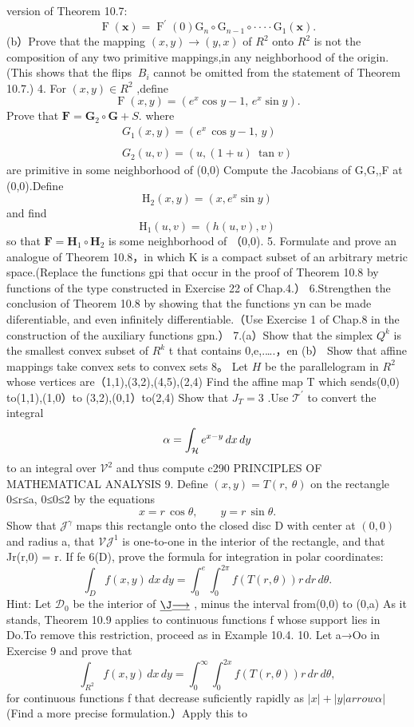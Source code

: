 version of Theorem 10.7: $$ \operatorname{F}(\mathbf{x})=\operatorname{F}^{\prime}(0)\mathrm{G}_{n}\circ\mathrm{G}_{n-1}\circ\cdot\cdot\cdot\cdot\mathrm{G}_{1}(\mathbf{x}). $$ (b）Prove that the mapping $(x,y)\to(y,x)$ of $R^{2}$ onto $R^{2}$ is not the composition of any two primitive mappings,in any neighborhood of the origin.(This shows that the flips $\ B_{i}$ cannot be omitted from the statement of Theorem 10.7.) 4. For $(x,y)\in R^{2}$ ,define $$ \operatorname{F}(x,y)=(e^{x}\cos y-1,\,e^{x}\sin y). $$ Prove that $\scriptstyle\mathbf{F}=\mathbf{G}_{2}\circ\mathbf{G}+S.$ where $$ \begin{array}{c}{{G_{1}(x,y)=(e^{x}\,\cos y-1,\,y)}}\\ {{{}}}\\ {{G_{2}(u,v)=(u,(1+u)\:\tan v)}}\end{array} $$ are primitive in some neighborhood of (0,0) Compute the Jacobians of G,G,,F at (0,0).Define $$ \mathrm{H}_{2}(x,y)=(x,e^{x}\sin y) $$ and find $$ {\mathrm{H}}_{1}(u,v)=(h(u,v),v) $$ so that $\mathbf{F}=\mathbf{H}_{1}\circ\mathbf{H}_{2}$ is some neighborhood of （0,0). 5. Formulate and prove an analogue of Theorem 10.8，in which K is a compact subset of an arbitrary metric space.(Replace the functions gpi that occur in the proof of Theorem 10.8 by functions of the type constructed in Exercise 22 of Chap.4.） 6.Strengthen the conclusion of Theorem 10.8 by showing that the functions yn can be made diferentiable, and even infinitely differentiable.（Use Exercise 1 of Chap.8 in the construction of the auxiliary functions gpn.） 7.(a）Show that the simplex $Q^{k}$ is the smallest convex subset of $R^{k}$ t that contains 0,e,.….，en (b） Show that affine mappings take convex sets to convex sets 8。 Let ${\mathbf{}}H$ be the parallelogram in $R^{2}$ whose vertices are（1,1),(3,2),(4,5),(2,4) Find the affine map T which sends(0,0) to(1,1),(1,0）to (3,2),(0,1）to(2,4) Show that $\scriptstyle J_{T}=3$ .Use ${\mathcal{T}}^{\prime}$ to convert the integral $$ \alpha=\int_{\cal H}e^{x-y}\,d x\,d y $$ to an integral over $\textstyle{\mathcal{V}}^{2}$ and thus compute c290 PRINCIPLES OF MATHEMATICAL ANALYSIS 9. Define $(x,y)=T(r,\ \theta)$ on the rectangle 0≤r≤a, 0≤0≤2 by the equations $$ x=r\,\cos\theta,\qquad y=r\,\sin\theta. $$ Show that ${\mathcal{J}}^{\gamma}$ maps this rectangle onto the closed disc D with center at $(0,0)$ and radius a, that ${\mathcal{V}}{\mathcal{J}}^{1}$ is one-to-one in the interior of the rectangle, and that Jr(r,0) = r. If fe 6(D), prove the formula for integration in polar coordinates: $$ \int_{\scriptscriptstyle D}f(x,y)\,d x\,d y=\int_{\scriptscriptstyle0}^{e}\int_{\scriptscriptstyle0}^{2\pi}f(T(r,\theta))r\,d r\,d\theta. $$ Hint: Let ${\mathcal{D}}_{0}$ be the interior of $\underline{{{\J}}}\underline{{{\longrightarrow}}}$ , minus the interval from(0,0) to (0,a) As it stands, Theorem 10.9 applies to continuous functions f whose support lies in Do.To remove this restriction, proceed as in Example 10.4. 10. Let a→Oo in Exercise 9 and prove that $$ \int_{R^{2}}f(x,y)\,d x\,d y=\int_{0}^{\infty}\int_{0}^{2x}f(T(r,\theta))r\,d r\,d\theta, $$ for continuous functions f that decrease suficiently rapidly as $|x|+|y| arrow\alpha|$ (Find a more precise formulation.）Apply this to 